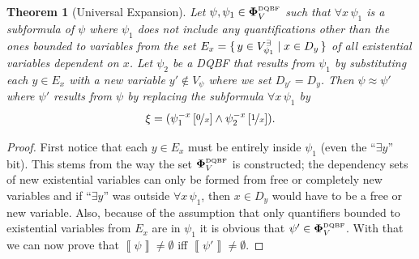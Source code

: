 \documentclass[
  digital, %
  color,
  twoside, %
  table,   %
  nolof,     %
  nolot,     %
]{fithesis3}
\let\setbuilder\set
\newcommand{\simpleset}[1]{\{{#1}\}}
\renewcommand{\set}[1]{\normalexpandarg\IfSubStr{#1}{|}{\setbuilder{#1}}{\simpleset{#1}}}
\newtheorem{theorem}{Theorem}[chapter] %
\theoremstyle{definition}
\theoremstyle{remark}
\newcommand{\seman}[1]{\left\llbracket {#1} \right\rrbracket}
\newcommand{\substitute}[2]{\left[ \nicefrac{#2}{#1} \right]}
\newcommand{\DQBF}[1]{\mathbf{\Phi}_{#1}^{\normalfont{\text{\tiny DQBF}}}}
\newcommand{\evars}[1]{V_{#1}^{\exists}}
\newcommand{\itholds}{\,}
\begin{document}
\begin{theorem}[Universal Expansion]
\label{thrm:unExpan}
  Let $\psi, \psi_1 \in \DQBF{V}$ such that $\forall x \itholds \psi_1$ is a subformula of $\psi$ where $\psi_1$ does not include any quantifications other than the ones bounded to variables from the set $E_{x} = \set{y \in \evars{\psi_1} | x \in D_y}$ of all existential variables dependent on $x$. Let $\psi_2$ be a DQBF that results from $\psi_1$ by substituting each $y \in E_x$ with a new variable $y' \not\in V_{\psi}$ where we set $D_{y'} = D_y$. Then $\psi \approx \psi'$ where $\psi'$ results from $\psi$ by replacing the subformula $\forall x \itholds \psi_1$ by 
  \[\xi = (\psi_1^{-x}\substitute{x}{0} \land \psi_2^{-x}\substitute{x}{1}).\]
\end{theorem}
\begin{proof}
  First notice that each $y \in E_x$ must be entirely inside $\psi_1$ (even the ``$\exists y$'' bit). This stems from the way the set $\DQBF{V}$ is constructed; the dependency sets of new existential variables can only be formed from free or completely new variables and if ``$\exists y$'' was outside $\forall x \itholds \psi_1$, then $x \in D_y$ would have to be a free or new variable. Also, because of the assumption that only quantifiers bounded to existential variables from $E_x$
  are in $\psi_1$ it is obvious that $\psi' \in \DQBF{V}$. With that we can now prove that $\seman{\psi} \not= \emptyset$ iff $\seman{\psi'} \not= \emptyset$.
  

\end{proof}
\end{document}

